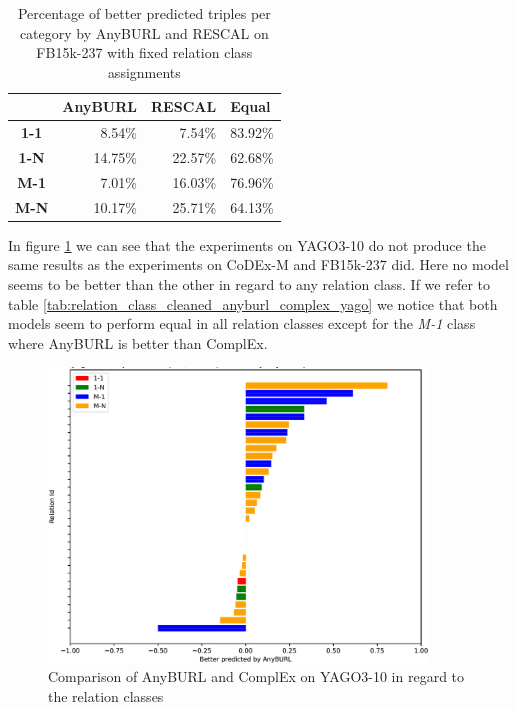 \begin{table}[H]
\centering
\begin{tabular}{c|rrr}
\multicolumn{1}{l|}{} & \multicolumn{1}{c}{\textbf{AnyBURL}} & \multicolumn{1}{c}{\textbf{RESCAL}} & \multicolumn{1}{l}{\textbf{Equal}} \\ \hline
\textbf{1-1} & 8.54\% & 7.54\% & 83.92\% \\
\textbf{1-N} & 14.75\% & 22.57\% & 62.68\% \\
\textbf{M-1} & 7.01\% & 16.03\% & 76.96\% \\
\textbf{M-N} & 10.17\% & 25.71\% & 64.13\%
\end{tabular}
\caption{Percentage of better predicted triples per category by AnyBURL and RESCAL on FB15k-237 with fixed relation class assignments}
\label{tab:relation_class_cleaned_anyburl_rescal_fb15k}
\end{table}

In figure \ref{fig:relation_class_anyburl_complex_yago} we can see that the experiments on YAGO3-10 do not produce the same results as the experiments on CoDEx-M and FB15k-237 did. Here no model seems to be better than the other in regard to any relation class. If we refer to table \ref{tab:relation_class_cleaned_anyburl_complex_yago} we notice that both models seem to perform equal in all relation classes except for the \textit{M-1} class where AnyBURL is better than ComplEx. 

\begin{figure}[H]
\centering
\includegraphics[width=0.9\textwidth]{images/relation_class_anyburl_complex_yago.PNG}
\caption{Comparison of AnyBURL and ComplEx on YAGO3-10 in regard to the relation classes}
\label{fig:relation_class_anyburl_complex_yago}
\end{figure}

